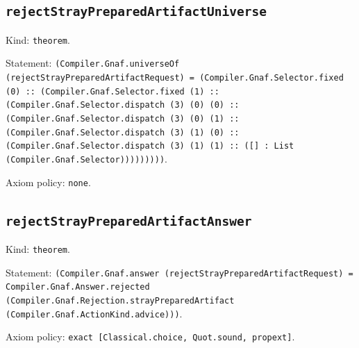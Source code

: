 \documentclass[11pt]{article}
\begin{document}
\subsection*{\texttt{rejectStrayPreparedArtifactUniverse}}
\noindent Kind: \texttt{theorem}.\par
\noindent Statement: \texttt{(Compiler.Gnaf.universeOf (rejectStrayPreparedArtifactRequest) = (Compiler.Gnaf.Selector.fixed (0) :: (Compiler.Gnaf.Selector.fixed (1) :: (Compiler.Gnaf.Selector.dispatch (3) (0) (0) :: (Compiler.Gnaf.Selector.dispatch (3) (0) (1) :: (Compiler.Gnaf.Selector.dispatch (3) (1) (0) :: (Compiler.Gnaf.Selector.dispatch (3) (1) (1) :: ([] : List (Compiler.Gnaf.Selector)))))))))}.\par
\noindent Axiom policy: \texttt{none}.\par
\subsection*{\texttt{rejectStrayPreparedArtifactAnswer}}
\noindent Kind: \texttt{theorem}.\par
\noindent Statement: \texttt{(Compiler.Gnaf.answer (rejectStrayPreparedArtifactRequest) = Compiler.Gnaf.Answer.rejected (Compiler.Gnaf.Rejection.strayPreparedArtifact (Compiler.Gnaf.ActionKind.advice)))}.\par
\noindent Axiom policy: \texttt{exact [Classical.choice, Quot.sound, propext]}.\par
\end{document}
